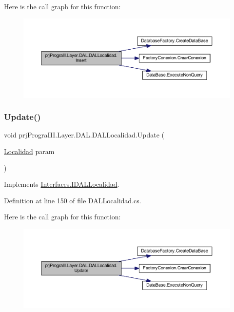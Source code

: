 Here is the call graph for this function\+:
\nopagebreak
\begin{figure}[H]
\begin{center}
\leavevmode
\includegraphics[width=350pt]{classprj_progra_i_i_i_1_1_layer_1_1_d_a_l_1_1_d_a_l_localidad_ac4a6e2c416a8372500396dcdb78a9f90_cgraph}
\end{center}
\end{figure}
\hypertarget{classprj_progra_i_i_i_1_1_layer_1_1_d_a_l_1_1_d_a_l_localidad_a6d28e0253b702b4cd246f15bda5505eb}{}\label{classprj_progra_i_i_i_1_1_layer_1_1_d_a_l_1_1_d_a_l_localidad_a6d28e0253b702b4cd246f15bda5505eb} 
\subsubsection{\texorpdfstring{Update()}{Update()}}
{\footnotesize\ttfamily void prj\+Progra\+I\+I\+I.\+Layer.\+D\+A\+L.\+D\+A\+L\+Localidad.\+Update (\begin{DoxyParamCaption}\item[{\hyperlink{classprj_progra_i_i_i_1_1_layer_1_1_entities_1_1_localidad}{Localidad}}]{param }\end{DoxyParamCaption})}



Implements \hyperlink{interface_interfaces_1_1_i_d_a_l_localidad_a42a1b56da7dcc40c2843e0ecd2287347}{Interfaces.\+I\+D\+A\+L\+Localidad}.



Definition at line 150 of file D\+A\+L\+Localidad.\+cs.

Here is the call graph for this function\+:
\nopagebreak
\begin{figure}[H]
\begin{center}
\leavevmode
\includegraphics[width=350pt]{classprj_progra_i_i_i_1_1_layer_1_1_d_a_l_1_1_d_a_l_localidad_a6d28e0253b702b4cd246f15bda5505eb_cgraph}
\end{center}
\end{figure}


